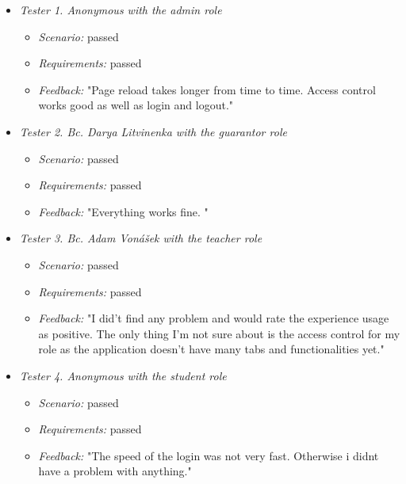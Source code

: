 \begin{itemize}
    \item \emph{Tester 1. Anonymous with the admin role}
        \begin{itemize}
            \item \emph{Scenario:} passed
            \item \emph{Requirements:} passed
            \item \emph{Feedback:} "Page reload takes longer from time to time. Access control works good as well as login and logout."
        \end{itemize}
    \item \emph{Tester 2. Bc. Darya Litvinenka with the guarantor role}
            \begin{itemize}
            \item \emph{Scenario:} passed 
            \item \emph{Requirements:} passed
            \item \emph{Feedback:} "Everything works fine. "
        \end{itemize}
    \item \emph{Tester 3. Bc. Adam Vonášek with the teacher role}
            \begin{itemize}
            \item \emph{Scenario:} passed
            \item \emph{Requirements:} passed
            \item \emph{Feedback:} "I did't find any problem and would rate the experience usage as positive. The only thing I'm not sure about is the access control for my role as the application doesn't have many tabs and functionalities yet."
        \end{itemize}
    \item \emph{Tester 4. Anonymous with the student role}
            \begin{itemize}
            \item \emph{Scenario:} passed
            \item \emph{Requirements:} passed
            \item \emph{Feedback:} "The speed of the login was not very fast. Otherwise i didnt have a problem with anything."
        \end{itemize}
\end{itemize}
